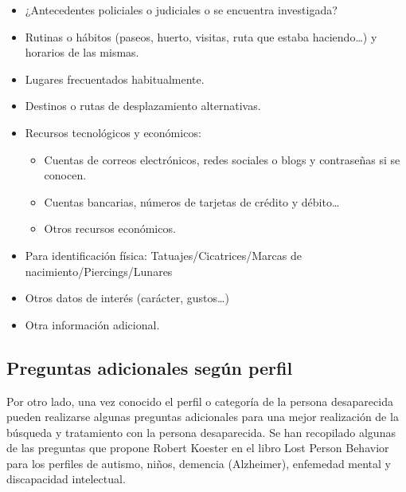 \begin{itemize}
    \item ¿Antecedentes policiales o judiciales o se encuentra investigada?
    \item Rutinas o hábitos (paseos, huerto, visitas, ruta que estaba haciendo…) y horarios de las mismas.
    \item Lugares frecuentados habitualmente.
    \item Destinos o rutas de desplazamiento alternativas.
    \item Recursos tecnológicos y económicos:
    \begin{itemize}
        \item Cuentas de correos electrónicos, redes sociales o blogs y contraseñas si se conocen.
        \item Cuentas bancarias, números de tarjetas de crédito y débito…
        \item Otros recursos económicos.
    \end{itemize}
    \item Para identificación física: Tatuajes/Cicatrices/Marcas de nacimiento/Piercings/Lunares
    \item Otros datos de interés (carácter, gustos…)
    \item Otra información adicional.
\end{itemize}


\subsection{Preguntas adicionales según perfil}

Por otro lado, una vez conocido el perfil o categoría de la persona desaparecida pueden realizarse algunas preguntas adicionales para una mejor realización de la búsqueda y tratamiento con la persona desaparecida. Se han recopilado algunas de las preguntas que propone Robert Koester en el libro Lost Person Behavior para los perfiles de autismo, niños, demencia (Alzheimer), enfemedad mental y discapacidad intelectual.

